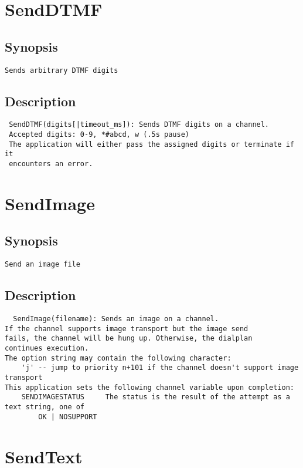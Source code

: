 \section{SendDTMF}
\subsection{Synopsis}
\begin{verbatim}
Sends arbitrary DTMF digits
\end{verbatim}
\subsection{Description}
\begin{verbatim}
 SendDTMF(digits[|timeout_ms]): Sends DTMF digits on a channel. 
 Accepted digits: 0-9, *#abcd, w (.5s pause)
 The application will either pass the assigned digits or terminate if it
 encounters an error.

\end{verbatim}


\section{SendImage}
\subsection{Synopsis}
\begin{verbatim}
Send an image file
\end{verbatim}
\subsection{Description}
\begin{verbatim}
  SendImage(filename): Sends an image on a channel. 
If the channel supports image transport but the image send
fails, the channel will be hung up. Otherwise, the dialplan
continues execution.
The option string may contain the following character:
	'j' -- jump to priority n+101 if the channel doesn't support image transport
This application sets the following channel variable upon completion:
	SENDIMAGESTATUS		The status is the result of the attempt as a text string, one of
		OK | NOSUPPORT 

\end{verbatim}


\section{SendText}
